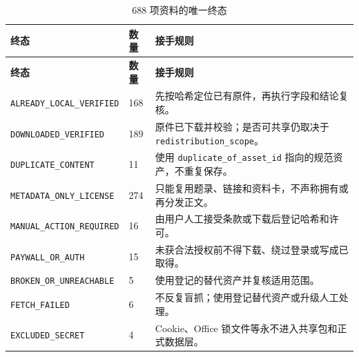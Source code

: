 \documentclass[UTF8,fontset=windows,12pt,openany]{ctexbook}
\newcommand{\Field}[1]{{\small\nolinkurl{#1}}}
\begin{document}
\begin{longtable}{p{4.2cm}p{2.0cm}p{7.4cm}}
\caption{688 项资料的唯一终态}\label{tab:v41-terminal-status}\\
\toprule
\textbf{终态} & \textbf{数量} & \textbf{接手规则}\\
\midrule
\endfirsthead
\toprule \textbf{终态} & \textbf{数量} & \textbf{接手规则}\\ \midrule
\endhead
\Field{ALREADY_LOCAL_VERIFIED} & 168 & 先按哈希定位已有原件，再执行字段和结论复核。\\
\Field{DOWNLOADED_VERIFIED} & 189 & 原件已下载并校验；是否可共享仍取决于 \Field{redistribution_scope}。\\
\Field{DUPLICATE_CONTENT} & 11 & 使用 \Field{duplicate_of_asset_id} 指向的规范资产，不重复保存。\\
\Field{METADATA_ONLY_LICENSE} & 274 & 只能复用题录、链接和资料卡，不声称拥有或再分发正文。\\
\Field{MANUAL_ACTION_REQUIRED} & 16 & 由用户人工接受条款或下载后登记哈希和许可。\\
\Field{PAYWALL_OR_AUTH} & 15 & 未获合法授权前不得下载、绕过登录或写成已取得。\\
\Field{BROKEN_OR_UNREACHABLE} & 5 & 使用登记的替代资产并复核适用范围。\\
\Field{FETCH_FAILED} & 6 & 不反复盲抓；使用登记替代资产或升级人工处理。\\
\Field{EXCLUDED_SECRET} & 4 & Cookie、Office 锁文件等永不进入共享包和正式数据层。\\
\bottomrule
\end{longtable}
\end{document}
